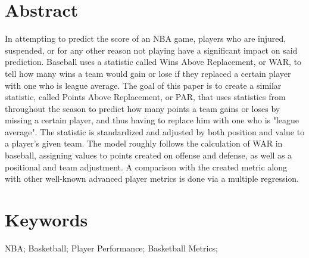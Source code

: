 \documentclass[12pt, titlepage]{article}
\begin{document}
\section*{Abstract}
In attempting to predict the score of an NBA game, players who are injured, suspended, or for any other 
reason not playing have a significant impact on said prediction. Baseball uses a statistic called Wins Above 
Replacement, or WAR, to tell how many wins a team would gain or lose if they replaced a certain player 
with one who is league average. The goal of this paper is to create a similar statistic, called Points Above 
Replacement, or PAR, that uses statistics from throughout the season to predict how many points a team 
gains or loses by missing a certain player, and thus having to replace him with one who is "league 
average". The statistic is standardized and adjusted by both position and value to a player's given team. 
The model roughly follows the calculation of WAR in baseball, assigning values to points created on offense 
and defense, as well as a positional and team adjustment. A comparison with the created metric along with 
other well-known advanced player metrics is done via a multiple regression.

\section*{Keywords} 
NBA; Basketball; Player Performance; Basketball Metrics;
\vspace{.12 in}
\end{document}
